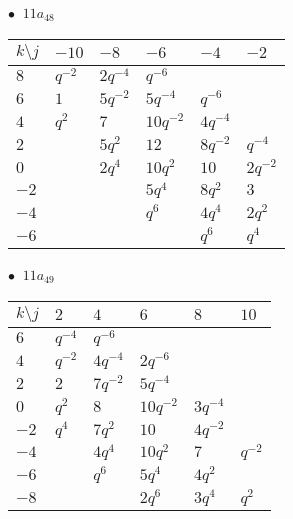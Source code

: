 \begin{minipage}{\linewidth}
$\bullet\ $ $11a_{48}$ \vspace{0.5em} \\
\begin{tabular}{l|lllll}
$k \setminus j$ & $-10$ & $-8$ & $-6$ & $-4$ & $-2$ \\
\hline
$8$ & $q^{-2}$ & $2q^{-4}$ & $q^{-6}$ &  &  \\
$6$ & $1$ & $5q^{-2}$ & $5q^{-4}$ & $q^{-6}$ &  \\
$4$ & $q^{2}$ & $7$ & $10q^{-2}$ & $4q^{-4}$ &  \\
$2$ &  & $5q^{2}$ & $12$ & $8q^{-2}$ & $q^{-4}$ \\
$0$ &  & $2q^{4}$ & $10q^{2}$ & $10$ & $2q^{-2}$ \\
$-2$ &  &  & $5q^{4}$ & $8q^{2}$ & $3$ \\
$-4$ &  &  & $q^{6}$ & $4q^{4}$ & $2q^{2}$ \\
$-6$ &  &  &  & $q^{6}$ & $q^{4}$ \\
\end{tabular}
\vspace{2em}
\end{minipage}
%
\begin{minipage}{\linewidth}
$\bullet\ $ $11a_{49}$ \vspace{0.5em} \\
\begin{tabular}{l|lllll}
$k \setminus j$ & $2$ & $4$ & $6$ & $8$ & $10$ \\
\hline
$6$ & $q^{-4}$ & $q^{-6}$ &  &  &  \\
$4$ & $q^{-2}$ & $4q^{-4}$ & $2q^{-6}$ &  &  \\
$2$ & $2$ & $7q^{-2}$ & $5q^{-4}$ &  &  \\
$0$ & $q^{2}$ & $8$ & $10q^{-2}$ & $3q^{-4}$ &  \\
$-2$ & $q^{4}$ & $7q^{2}$ & $10$ & $4q^{-2}$ &  \\
$-4$ &  & $4q^{4}$ & $10q^{2}$ & $7$ & $q^{-2}$ \\
$-6$ &  & $q^{6}$ & $5q^{4}$ & $4q^{2}$ &  \\
$-8$ &  &  & $2q^{6}$ & $3q^{4}$ & $q^{2}$ \\
\end{tabular}
\vspace{2em}
\end{minipage}
%
